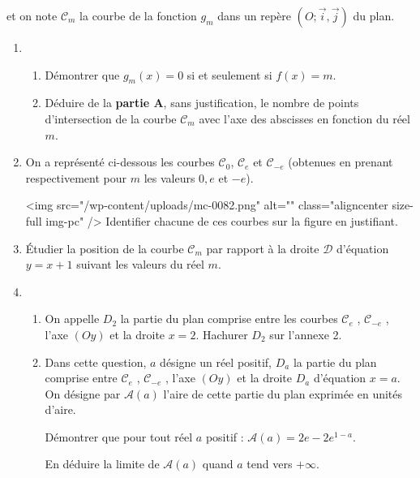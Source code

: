 et on note $\mathscr C_{m}$ la courbe de la fonction $g_{m}$ dans un repère $\left(O; \vec{i}, \vec{j}\right)$ du plan.
\begin{enumerate}
     \item
     \begin{enumerate}[label=\alph*.]
          \item
          Démontrer que $g_{m}\left(x\right)=0$ si et seulement si $f\left(x\right)=m$.
          \item
     Déduire de la \textbf{partie A}, sans justification, le nombre de points d'intersection de la courbe $\mathscr C_{m}$ avec l'axe des abscisses en fonction du réel $m$.\end{enumerate}
     \item
     On a représenté ci-dessous les courbes $\mathscr C_{0}$, $\mathscr C_{e}$ et $\mathscr C_{-e}$ (obtenues en prenant respectivement pour $m$ les valeurs $0, e$ et $-e$).

\begin{center}
\end{center}
     <img src="/wp-content/uploads/mc-0082.png" alt="" class="aligncenter size-full  img-pc" />
     Identifier chacune de ces courbes sur la figure en justifiant.
     \item
     Étudier la position de la courbe $\mathscr C_{m}$ par rapport à la droite $\mathscr D$ d'équation $y=x+1$ suivant les valeurs du réel $m$.
     \item
     \begin{enumerate}[label=\alph*.]
          \item
          On appelle $D_{2}$ la partie du plan comprise entre les courbes $\mathscr C_{e}$ , $\mathscr C_{-e}$ , l'axe $\left(Oy\right)$ et la droite $x=2$. Hachurer $D_{2}$ sur l'annexe 2.
          \item
          Dans cette question, $a$ désigne un réel positif, $D_{a}$ la partie du plan comprise entre $\mathscr C_{e}$ , $\mathscr C_{-e}$ , l'axe $\left(Oy\right)$ et la droite $D_{a}$ d'équation $x=a$. On désigne par $\mathscr A\left(a\right)$ l'aire de cette partie du plan exprimée en unités d'aire.
          \par
          Démontrer que pour tout réel $a$ positif : $\mathscr A\left(a\right)=2e-2e^{1-a}$.
          \par
     En déduire la limite de $\mathscr A\left(a\right)$ quand $a$ tend vers $+ \infty $.\end{enumerate}
\end{enumerate}
